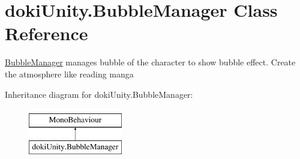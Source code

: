\hypertarget{classdoki_unity_1_1_bubble_manager}{}\section{doki\+Unity.\+Bubble\+Manager Class Reference}
\label{classdoki_unity_1_1_bubble_manager}


\hyperlink{classdoki_unity_1_1_bubble_manager}{Bubble\+Manager} manages bubble of the character to show bubble effect. Create the atmosphere like reading manga  


Inheritance diagram for doki\+Unity.\+Bubble\+Manager\+:\begin{figure}[H]
\begin{center}
\leavevmode
\includegraphics[height=2.000000cm]{classdoki_unity_1_1_bubble_manager}
\end{center}
\end{figure}
